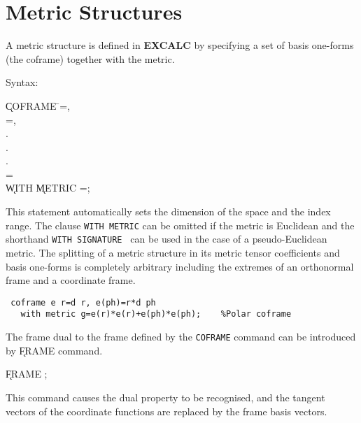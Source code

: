 \section{Metric Structures}

A metric structure is defined in {\bf EXCALC} by specifying a set of
basis one-forms (the coframe) together with the metric.

Syntax:\label{COFRAME}

\begin{tabbing}
\hspace*{2em} \k{COFRAME} \=
=, \\
\> =, \\
\> . \\
\> . \\
\> . \\
\> = \\
\> \hspace{1em} \k{WITH} \k{METRIC} =; \\
\end{tabbing}

This statement automatically sets the dimension of the space and the
index range. The clause {\tt WITH METRIC} can be omitted if the metric
is Euclidean and the shorthand {\tt WITH SIGNATURE }
\label{SIGNATURE} can be used in the case of a pseudo-Euclidean
metric. The splitting of a metric structure in its metric tensor
coefficients and basis one-forms is completely arbitrary including the
extremes of an orthonormal frame and a coordinate frame.

\newpage
\example{}

\begin{verbatim}
 coframe e r=d r, e(ph)=r*d ph
   with metric g=e(r)*e(r)+e(ph)*e(ph);    %Polar coframe
\end{verbatim}

The frame dual to the frame defined by the {\tt COFRAME} command can
be introduced by \k{FRAME} command.

\hspace*{2em} \k{FRAME} ;\label{FRAME}

This command causes the
dual property to be recognised, and the tangent vectors of the
coordinate functions are replaced by the frame basis vectors.

